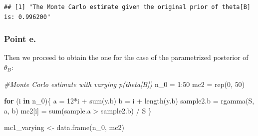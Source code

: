 \documentclass[
  11pt,
]{article}
\newenvironment{Shaded}{\begin{snugshade}}{\end{snugshade}}
\newcommand{\CommentTok}[1]{\textcolor[rgb]{0.56,0.35,0.01}{\textit{#1}}}
\newcommand{\ControlFlowTok}[1]{\textcolor[rgb]{0.13,0.29,0.53}{\textbf{#1}}}
\newcommand{\DecValTok}[1]{\textcolor[rgb]{0.00,0.00,0.81}{#1}}
\newcommand{\FunctionTok}[1]{\textcolor[rgb]{0.00,0.00,0.00}{#1}}
\newcommand{\NormalTok}[1]{#1}
\newcommand{\OtherTok}[1]{\textcolor[rgb]{0.56,0.35,0.01}{#1}}
\newcommand{\SpecialCharTok}[1]{\textcolor[rgb]{0.00,0.00,0.00}{#1}}
\begin{document}
\begin{verbatim}
## [1] "The Monte Carlo estimate given the original prior of theta[B] is: 0.996200"
\end{verbatim}

\normalsize

\hypertarget{point-e.-1}{%
\subsubsection{Point e.}\label{point-e.-1}}

Then we proceed to obtain the one for the case of the parametrized
posterior of \(\theta_B\):

\scriptsize

\begin{Shaded}
\begin{Highlighting}[]
\CommentTok{\#Monte Carlo estimate with varying p(theta[B])}
\NormalTok{n\_0 }\OtherTok{=} \DecValTok{1}\SpecialCharTok{:}\DecValTok{50}
\NormalTok{mc2 }\OtherTok{=} \FunctionTok{rep}\NormalTok{(}\DecValTok{0}\NormalTok{, }\DecValTok{50}\NormalTok{)}

\ControlFlowTok{for}\NormalTok{ (i }\ControlFlowTok{in}\NormalTok{ n\_0)\{}
\NormalTok{  a }\OtherTok{=} \DecValTok{12}\SpecialCharTok{*}\NormalTok{i }\SpecialCharTok{+} \FunctionTok{sum}\NormalTok{(y.b)}
\NormalTok{  b }\OtherTok{=}\NormalTok{ i }\SpecialCharTok{+} \FunctionTok{length}\NormalTok{(y.b)}
\NormalTok{  sample2.b }\OtherTok{=} \FunctionTok{rgamma}\NormalTok{(S, a, b)}
\NormalTok{  mc2[i] }\OtherTok{=} \FunctionTok{sum}\NormalTok{(sample.a }\SpecialCharTok{\textgreater{}}\NormalTok{ sample2.b) }\SpecialCharTok{/}\NormalTok{ S}
\NormalTok{\}}

\NormalTok{mc1\_varying }\OtherTok{\textless{}{-}} \FunctionTok{data.frame}\NormalTok{(n\_0, mc2)}
\end{Highlighting}
\end{Shaded}
\end{document}
